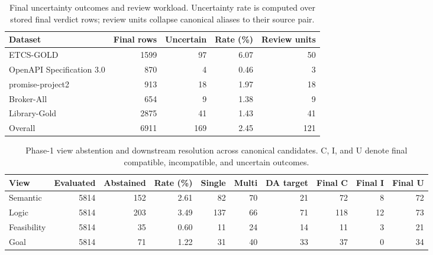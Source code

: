 \begin{table}[t]
\centering
\caption{Final uncertainty outcomes and review workload. Uncertainty rate is computed over stored final verdict rows; review units collapse canonical aliases to their source pair.}
\label{tab:uncertainty-final}
\begin{tabular}{lrrrr}
\toprule
Dataset & Final rows & Uncertain & Rate (\%) & Review units \\
\midrule
ETCS-GOLD & 1599 & 97 & 6.07 & 50 \\
OpenAPI Specification 3.0 & 870 & 4 & 0.46 & 3 \\
promise-project2 & 913 & 18 & 1.97 & 18 \\
Broker-All & 654 & 9 & 1.38 & 9 \\
Library-Gold & 2875 & 41 & 1.43 & 41 \\
\midrule
Overall & 6911 & 169 & 2.45 & 121 \\
\bottomrule
\end{tabular}
\end{table}

\begin{table}[t]
\centering
\caption{Phase-1 view abstention and downstream resolution across canonical candidates. C, I, and U denote final compatible, incompatible, and uncertain outcomes.}
\label{tab:uncertainty-views}
\begin{tabular}{lrrrrrrrrr}
\toprule
View & Evaluated & Abstained & Rate (\%) & Single & Multi & DA target & Final C & Final I & Final U \\
\midrule
Semantic & 5814 & 152 & 2.61 & 82 & 70 & 21 & 72 & 8 & 72 \\
Logic & 5814 & 203 & 3.49 & 137 & 66 & 71 & 118 & 12 & 73 \\
Feasibility & 5814 & 35 & 0.60 & 11 & 24 & 14 & 11 & 3 & 21 \\
Goal & 5814 & 71 & 1.22 & 31 & 40 & 33 & 37 & 0 & 34 \\
\bottomrule
\end{tabular}
\end{table}
